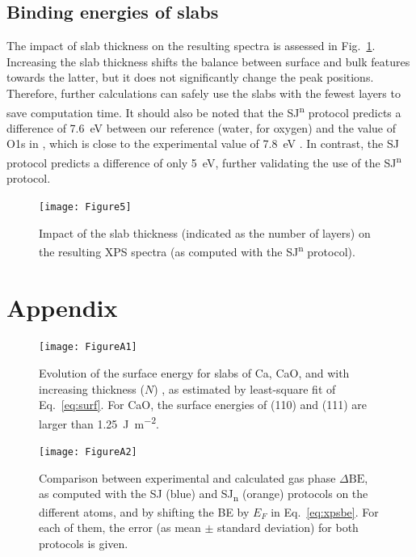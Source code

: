 \documentclass[12pt,a4paper]{article}
\def\dbe{\ensuremath{\Delta\text{BE}}}
\begin{document}
\clearpage
\subsection{Binding energies of slabs}

The impact of slab thickness on the resulting spectra is assessed in Fig.~\ref{fig:slabsthickness}. Increasing the slab thickness shifts the balance between surface and bulk features towards the latter, but it does not significantly change the peak positions. Therefore, further calculations can safely use the slabs with the fewest layers to save computation time. It should also be noted that the SJ\textsuperscript{n} protocol predicts a difference of \SI{7.6}{\electronvolt} between our reference (water, for oxygen) and the value of O1s in , which is close to the experimental value of \SI{7.8}{\electronvolt} \cite{cristHandbookMonochromaticXPS1999}. In contrast, the SJ protocol predicts a difference of only \SI{5}{\electronvolt}, further validating the use of the SJ\textsuperscript{n} protocol.


\begin{figure}[!h]
	\centering
	\texttt{[image: Figure5]}
	\caption{Impact of the slab thickness (indicated as the number of layers) on the resulting XPS spectra (as computed with the SJ\textsuperscript{n} protocol).}
	\label{fig:slabsthickness}
\end{figure}

\clearpage



\clearpage
\appendix
{}
\section{Appendix}
\begin{figure}[!h]
	\texttt{[image: FigureA1]}
	\caption{Evolution of the surface energy for slabs of Ca, CaO, and  with increasing thickness ($N$) , as estimated by least-square fit of Eq.~\eqref{eq:surf}. For CaO, the surface energies of (110) and (111) are larger than \SI{1.25}{\joule\per\meter\squared}.}
	\label{fig:surf}
\end{figure}

\begin{figure}[!h]
	\centering
	\texttt{[image: FigureA2]}
	\caption{Comparison between experimental and calculated gas phase \dbe{}, as computed with the SJ (blue) and SJ\textsubscript{n} (orange) protocols on the different atoms, and by shifting the BE by $E_F$ in Eq.~\eqref{eq:xpsbe}. For each of them, the error (as mean $\pm$ standard deviation) for both protocols is given.}
	\label{fig:xps_C185_fermi}
\end{figure}
	
\end{document}
